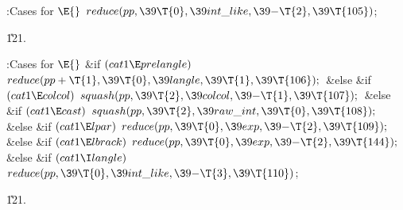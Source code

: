 \B{}:Cases for \X${}\E{}$\6
$\\{reduce}(\\{pp},\39\T{0},\39\\{int\_like},\39{-}\T{2},\39\T{105}){}$;\par
\U121.\fi

\B{}:Cases for \X${}\E{}$\6
\&{if} ${}(\\{cat1}\E\\{prelangle}){}$\1\5
${}\\{reduce}(\\{pp}+\T{1},\39\T{0},\39\\{langle},\39\T{1},\39\T{106});{}$\2\6
\&{else} \&{if} ${}(\\{cat1}\E\\{colcol}){}$\1\5
${}\\{squash}(\\{pp},\39\T{2},\39\\{colcol},\39{-}\T{1},\39\T{107});{}$\2\6
\&{else} \&{if} ${}(\\{cat1}\E\\{cast}){}$\1\5
${}\\{squash}(\\{pp},\39\T{2},\39\\{raw\_int},\39\T{0},\39\T{108});{}$\2\6
\&{else} \&{if} ${}(\\{cat1}\E\\{lpar}){}$\1\5
${}\\{reduce}(\\{pp},\39\T{0},\39\\{exp},\39{-}\T{2},\39\T{109});{}$\2\6
\&{else} \&{if} ${}(\\{cat1}\E\\{lbrack}){}$\1\5
${}\\{reduce}(\\{pp},\39\T{0},\39\\{exp},\39{-}\T{2},\39\T{144});{}$\2\6
\&{else} \&{if} ${}(\\{cat1}\I\\{langle}){}$\1\5
${}\\{reduce}(\\{pp},\39\T{0},\39\\{int\_like},\39{-}\T{3},\39\T{110}){}$;\2\par
\U121.\fi


